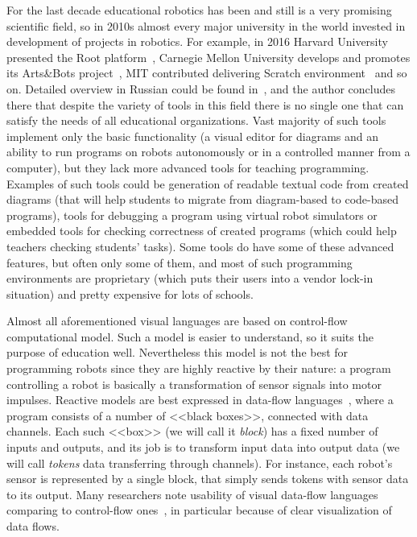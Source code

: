 \documentclass[conference]{IEEEtran}
\begin{document}
For the last decade educational robotics has been and still is a very promising scientific field, so in 2010s almost every major university in the world invested in development of projects in robotics. For example, in 2016 Harvard University presented the Root platform~\cite{root}, Carnegie Mellon University develops and promotes its Arts\&Bots project~\cite{cross2013visual}, MIT contributed delivering Scratch environment~\cite{resnick2009scratch} and so on. Detailed overview in Russian could be found in~\cite{mordvinov2016NONPUBLISHED}, and the author concludes there that despite the variety of tools in this field there is no single one that can satisfy the needs of all educational organizations. Vast majority of such tools implement only the basic functionality (a visual editor for diagrams and an ability to run programs on robots autonomously or in a controlled manner from a computer), but they lack more advanced tools for teaching programming. Examples of such tools could be generation of readable textual code from created diagrams (that will help students to migrate from diagram-based to code-based programs), tools for debugging a program using virtual robot simulators or embedded tools for checking correctness of created programs (which could help teachers checking students' tasks). Some tools do have some of these advanced features, but often only some of them, and most of such programming environments are proprietary (which puts their users into a vendor lock-in situation) and pretty expensive for lots of schools.

Almost all aforementioned visual languages are based on control-flow computational model. Such a model is easier to understand, so it suits the purpose of education well. Nevertheless this model is not the best for programming robots since they are highly reactive by their nature: a program controlling a robot is basically a transformation of sensor signals into motor impulses. Reactive models are best expressed in data-flow languages~\cite{johnston2004advances}, where a program consists of a number of <<black boxes>>, connected with data channels. Each such <<box>> (we will call it \textit{block}) has a fixed number of inputs and outputs, and its job is to transform input data into output data (we will call \textit{tokens} data transferring through channels). For instance, each robot's sensor is represented by a single block, that simply sends tokens with sensor data to its output. Many researchers  note usability of visual data-flow languages comparing to control-flow ones~\cite{johnston2004advances}, in particular because of clear visualization of data flows.
\end{document}
